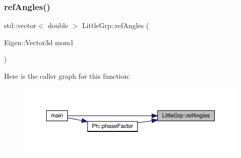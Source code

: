 \subsubsection{\texorpdfstring{refAngles()}{refAngles()}}
{\footnotesize\ttfamily std\+::vector$<$ double $>$ Little\+Grp\+::ref\+Angles (\begin{DoxyParamCaption}\item[{Eigen\+::\+Vector3d}]{mom1 }\end{DoxyParamCaption})}

Here is the caller graph for this function\+:\nopagebreak
\begin{figure}[H]
\begin{center}
\leavevmode
\includegraphics[width=350pt]{d1/d4c/namespaceLittleGrp_a93937e135b6b9c963ae9ad26516e252d_icgraph}
\end{center}
\end{figure}
